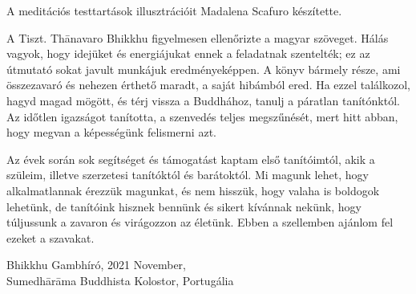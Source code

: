 A meditációs testtartások illusztrációit Madalena Scafuro készítette.

A Tiszt. Thānavaro Bhikkhu figyelmesen ellenőrizte a magyar szöveget.
Hálás vagyok, hogy idejüket és energiájukat ennek a feladatnak
szentelték; ez az útmutató sokat javult munkájuk eredményeképpen. A
könyv bármely része, ami összezavaró és nehezen érthető maradt, a saját
hibámból ered. Ha ezzel találkozol, hagyd magad mögött, és térj vissza a
Buddhához, tanulj a páratlan tanítónktól. Az időtlen igazságot
tanította, a szenvedés teljes megszűnését, mert hitt abban, hogy megvan
a képességünk felismerni azt.

Az évek során sok segítséget és támogatást kaptam első tanítóimtól, akik
a szüleim, illetve szerzetesi tanítóktól és barátoktól. Mi magunk lehet,
hogy alkalmatlannak érezzük magunkat, és nem hisszük, hogy valaha is
boldogok lehetünk, de tanítóink hisznek bennünk és sikert kívánnak
nekünk, hogy túljussunk a zavaron és virágozzon az életünk. Ebben a
szellemben ajánlom fel ezeket a szavakat.

\bigskip

\enlargethispage*{2\baselineskip}

{\raggedleft
Bhikkhu Gambhíró,
2021 November,\\
Sumedhārāma Buddhista Kolostor, Portugália
\par}

